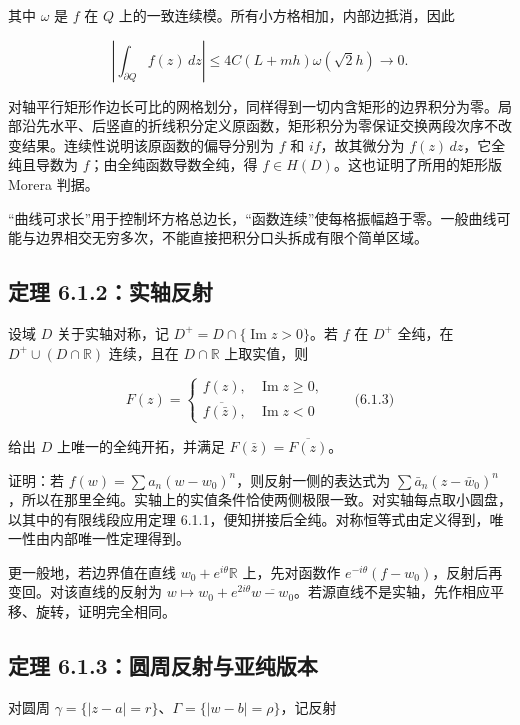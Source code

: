 \documentclass[11pt,a4paper]{article}
\begin{document}
其中 \(\omega\) 是 \(f\) 在 \(Q\)
上的一致连续模。所有小方格相加，内部边抵消，因此

\[
\left|\int_{\partial Q}f(z)\,dz\right|
\le4C(L+mh)\omega(\sqrt2h)\longrightarrow0.
\]

对轴平行矩形作边长可比的网格划分，同样得到一切内含矩形的边界积分为零。局部沿先水平、后竖直的折线积分定义原函数，矩形积分为零保证交换两段次序不改变结果。连续性说明该原函数的偏导分别为
\(f\) 和 \(if\)，故其微分为 \(f(z)\,dz\)，它全纯且导数为
\(f\)；由全纯函数导数全纯，得 \(f\in H(D)\)。这也证明了所用的矩形版
Morera 判据。

``曲线可求长''用于控制坏方格总边长，``函数连续''使每格振幅趋于零。一般曲线可能与边界相交无穷多次，不能直接把积分口头拆成有限个简单区域。

\subsection{定理 6.1.2：实轴反射}\label{ch06-s1-heading-2}

设域 \(D\) 关于实轴对称，记 \(D^+=D\cap\{\operatorname{Im}z>0\}\)。若
\(f\) 在 \(D^+\) 全纯，在 \(D^+\cup(D\cap\mathbb R)\) 连续，且在
\(D\cap\mathbb R\) 上取实值，则

\[
F(z)=\begin{cases}
f(z),&\operatorname{Im}z\ge0,\\
\overline{f(\bar z)},&\operatorname{Im}z<0
\end{cases}\qquad\text{(6.1.3)}
\]

给出 \(D\) 上唯一的全纯开拓，并满足 \(F(\bar z)=\overline{F(z)}\)。

证明：若 \(f(w)=\sum a_n(w-w_0)^n\)，则反射一侧的表达式为
\(\sum\bar a_n(z-\bar w_0)^n\)，所以在那里全纯。实轴上的实值条件恰使两侧极限一致。对实轴每点取小圆盘，以其中的有限线段应用定理
6.1.1，便知拼接后全纯。对称恒等式由定义得到，唯一性由内部唯一性定理得到。

更一般地，若边界值在直线 \(w_0+e^{i\theta}\mathbb R\) 上，先对函数作
\(e^{-i\theta}(f-w_0)\)，反射后再变回。对该直线的反射为
\(w\mapsto w_0+e^{2i\theta}\overline{w-w_0}\)。若源直线不是实轴，先作相应平移、旋转，证明完全相同。

\subsection{定理 6.1.3：圆周反射与亚纯版本}\label{ch06-s1-heading-3}

对圆周 \(\gamma=\{|z-a|=r\}\)、\(\Gamma=\{|w-b|=\rho\}\)，记反射
\end{document}
